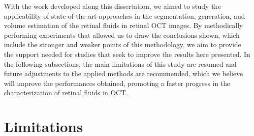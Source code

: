 \par
With the work developed along this dissertation, we aimed to study the applicability of state-of-the-art approaches in the segmentation, generation, and volume estimation of the retinal fluids in retinal OCT images. By methodically performing experiments that allowed us to draw the conclusions shown, which include the stronger and weaker points of this methodology, we aim to provide the support needed for studies that seek to improve the results here presented. In the following subsections, the main limitations of this study are resumed and future adjustments to the applied methods are recommended, which we believe will improve the performances obtained, promoting a faster progress in the characterization of retinal fluids in OCT.

\section{Limitations}

